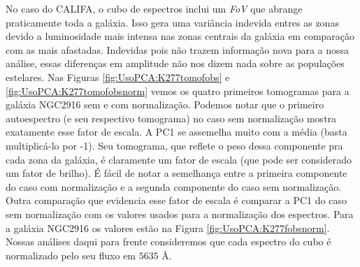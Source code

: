 No caso do CALIFA, o cubo de espectros inclui um {\em FoV} que abrange praticamente toda a galáxia. Isso gera uma
variância indevida entres as zonas devido a luminosidade mais intensa nas zonas centrais da galáxia em comparação com as
mais afastadas. Indevidas pois não trazem informação nova para a nossa análise, essas diferenças em amplitude não nos
dizem nada sobre as populações estelares. Nas Figuras \ref{fig:UsoPCA:K277tomofobs} e \ref{fig:UsoPCA:K277tomofobsnorm}
vemos os quatro primeiros tomogramas para a galáxia NGC2916 sem e com normalização. Podemos notar que o primeiro
autoespectro (e seu respectivo tomograma) no caso sem normalização mostra exatamente esse fator de escala. A PC1 se
assemelha muito com a média (basta multiplicá-lo por -1). Seu tomograma, que reflete o peso dessa componente pra cada
zona da galáxia, é claramente um fator de escala (que pode ser considerado um fator de brilho). É fácil de notar a
semelhança entre a primeira componente do caso com normalização e a segunda componente do caso sem normalização. Outra
comparação que evidencia esse fator de escala é comparar a PC1 do caso sem normalização com os valores usados para a
normalização dos espectros. Para a galáxia NGC2916 os valores estão na Figura \ref{fig:UsoPCA:K277fobsnorm}. Nossas
análises daqui para frente consideremos que cada espectro do cubo é normalizado pelo seu fluxo em $5635$ \AA.

